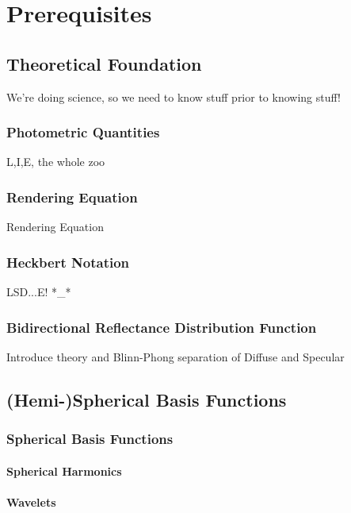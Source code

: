 \documentclass[thesis.tex]{subfiles}
\begin{document}
\chapter{Prerequisites}\label{chap:basics}

\section{Theoretical Foundation}
We're doing science, so we need to know stuff prior to knowing stuff!

\subsection{Photometric Quantities}
L,I,E, the whole zoo

\subsection{Rendering Equation}
Rendering Equation

\subsection{Heckbert Notation}
LSD...E! *\_*

\subsection{Bidirectional Reflectance Distribution Function}
Introduce theory and Blinn-Phong
separation of Diffuse and Specular

\section{(Hemi-)Spherical Basis Functions}

\subsection{Spherical Basis Functions}
\subsubsection{Spherical Harmonics}
\subsubsection{Wavelets}
\end{document}
